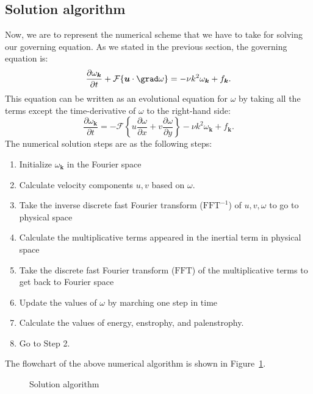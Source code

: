 \documentclass[12pt]{article}
\def\vk{\bm{k}}
\def\u{\bm{u}}
\begin{document}
\subsection{Solution algorithm}
Now, we are to represent the numerical scheme that we have to take for solving our governing equation. As we stated in the previous section, the governing equation is:
\begin{equation}\label{Eq-13}
\frac{\partial\omega_{\vk}}{\partial t} + \mathcal{F}\{\u\cdot\grad\omega\}= -\nu{k}^2\omega_{\vk} + f_{\vk}.
\end{equation}
%
This equation can be written as an evolutional equation for $\omega$ by taking all the terms except the time-derivative of $\omega$ to the right-hand side:
\begin{equation}\label{Eq-14}
\frac{\partial\omega_{\vk}}{\partial t} =- \mathcal{F}\left\lbrace u\dfrac{\partial \omega}{\partial x}+v\dfrac{\partial \omega}{\partial y}\right\rbrace -\nu k^2\omega_{\vk} + f_{\vk}.
\end{equation}
%
The numerical solution steps are as the following steps:
\begin{enumerate}
\item Initialize $\omega_{\vk}$ in the Fourier space
\item Calculate velocity components $u,v$ based on $\omega$.
\item Take the inverse discrete fast Fourier transform ($\text{FFT}^{-1}$) of $u,v,\omega$ to go to physical space
\item Calculate the multiplicative terms appeared in the inertial term in physical space
\item Take the discrete fast Fourier transform ($\text{FFT}$) of the multiplicative terms to get back to Fourier space
\item Update the values of $\omega$ by marching one step in time
\item Calculate the values of energy, enstrophy, and palenstrophy.
\item Go to Step 2.
\end{enumerate}
The flowchart of the above numerical algorithm is shown in Figure~\ref{algorithm}.
\begin{figure}[ht]
\begin{center}
\caption{Solution algorithm}\label{algorithm}
\end{center}
\end{figure}
\end{document}
